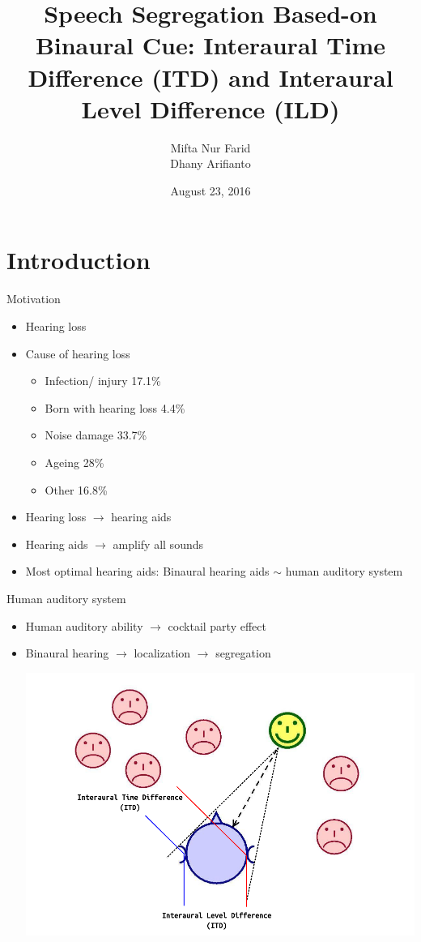 \documentclass{beamer}
\author{Mifta Nur Farid\\Dhany Arifianto}
\title{\huge Speech Segregation Based-on Binaural Cue: Interaural Time Difference (ITD) and Interaural Level Difference (ILD)}
\institute{VibrasticLab\\ Dept. of Engineering Physics ITS}
\date{August 23, 2016}
\begin{document}

\begin{frame}[t,plain]
\titlepage
\end{frame}


\section{Introduction}
\begin{frame}[t]{Motivation}
\begin{itemize}
\item Hearing loss
\item Cause of hearing loss
	\begin{itemize}
	\item Infection/ injury 17.1\%
	\item Born with hearing loss 4.4\%
	\item Noise damage 33.7\%
	\item Ageing 28\%
	\item Other 16.8\%
	\end{itemize}
\item Hearing loss $\rightarrow$ hearing aids
\item Hearing aids $\rightarrow$ amplify all sounds
\item Most optimal hearing aids: Binaural hearing aids $\sim$ human auditory system
\end{itemize}
\end{frame}

\begin{frame}[t]{Human auditory system}
\begin{itemize}
\item Human auditory ability $\rightarrow$ cocktail party effect
\item Binaural hearing $\rightarrow$ localization $\rightarrow$ segregation
\begin{center}
	\includegraphics[scale=0.25]{../pict/CPP.png}
\end{center}
\end{itemize}
\end{frame}
\end{document}
